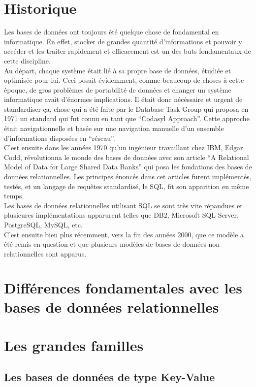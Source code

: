 \documentclass[11pt]{article}
\begin{document}
\section{Historique}
Les bases de données ont toujours été quelque chose de fondamental en informatique. En effet, stocker de grandes quantité d'informations et pouvoir y accéder et les traiter rapidement et efficacement est un des buts fondamentaux de cette discipline. \\
Au départ, chaque système était lié à sa propre base de données, étudiée et optimisée pour lui. Ceci posait évidemment, comme beaucoup de choses à cette époque, de gros problèmes de portabilité de données et changer un système informatique avait d'énormes implications. Il était donc nécéssaire et urgent de standardiser ça, chose qui a été faite par le Database Task Group qui proposa en 1971 un standard qui fut connu en tant que ``Codasyl Approach''. Cette approche était navigationnelle et basée sur une navigation manuelle d'un ensemble d'informations disposées en ``réseau''. \\
C'est ensuite dans les années 1970 qu'un ingénieur travaillant chez IBM, Edgar Codd, révolutionna le monde des bases de données avec son article ``A Relational Model of Data for Large Shared Data Banks'' qui posa les fondations des bases de données relationnelles. Les principes énoncés dans cet articles furent implémentés, testés, et un langage de requêtes standardisé, le SQL, fit son apparition en même temps. \\
Les bases de données relationnelles utilisant SQL se sont très vite répandues et plusieures implémentations apparurent telles que DB2, Microsoft SQL Server, PostgreSQL, MySQL, etc. \\
C'est ensuite bien plus récemment, vers la fin des années 2000, que ce modèle a été remis en question et que plusieurs modèles de bases de données non relationnelles sont apparus. 
\section{Différences fondamentales avec les bases de données relationnelles}

\section{Les grandes familles}
\subsection{Les bases de données de type Key-Value}
\end{document}
